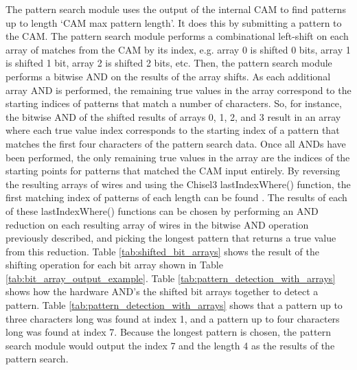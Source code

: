 \documentclass[doublespace,nopageskip]{VTthesis}
\begin{document}
The pattern search module uses the output of the internal CAM to find patterns up to length `CAM max pattern length'. It does this by submitting a pattern to the CAM. The pattern search module performs a combinational left-shift on each array of matches from the CAM by its index, e.g. array 0 is shifted 0 bits, array 1 is shifted 1 bit, array 2 is shifted 2 bits, etc. Then, the pattern search module performs a bitwise AND on the results of the array shifts. As each additional array AND is performed, the remaining true values in the array correspond to the starting indices of patterns that match a number of characters. So, for instance, the bitwise AND of the shifted results of arrays 0, 1, 2, and 3 result in an array where each true value index corresponds to the starting index of a pattern that matches the first four characters of the pattern search data. Once all ANDs have been performed, the only remaining true values in the array are the indices of the starting points for patterns that matched the CAM input entirely. By reversing the resulting arrays of wires and using the Chisel3 lastIndexWhere() function, the first matching index of patterns of each length can be found \cite{chisel3, chisel3documentation}. The results of each of these lastIndexWhere() functions can be chosen by performing an AND reduction on each resulting array of wires in the bitwise AND operation previously described, and picking the longest pattern that returns a true value from this reduction. Table \ref{tab:shifted_bit_arrays} shows the result of the shifting operation for each bit array shown in Table \ref{tab:bit_array_output_example}. Table \ref{tab:pattern_detection_with_arrays} shows how the hardware AND's the shifted bit arrays together to detect a pattern. Table \ref{tab:pattern_detection_with_arrays} shows that a pattern up to three characters long was found at index 1, and a pattern up to four characters long was found at index 7. Because the longest pattern is chosen, the pattern search module would output the index 7 and the length 4 as the results of the pattern search.
\end{document}
